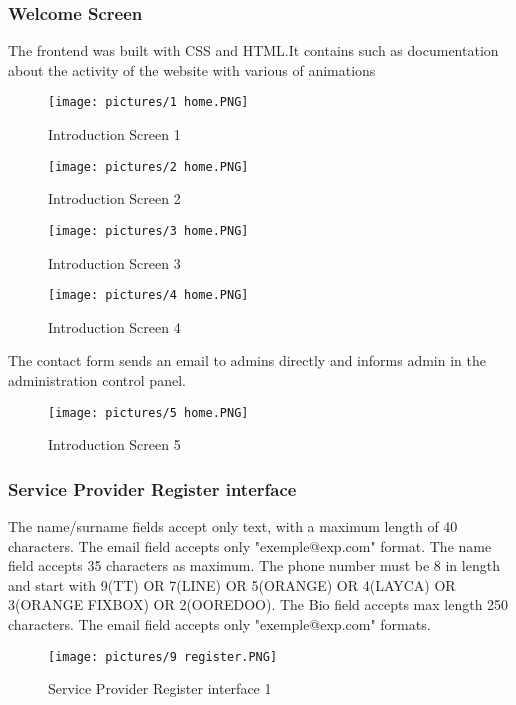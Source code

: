\documentclass[12pt]{report}
\begin{document}
\subsubsection{Welcome Screen}
The frontend was built with CSS and HTML.It contains such as documentation about the activity of the website with various of animations
\begin{figure}[!htbp]
    \centering
    \texttt{[image: pictures/1 home.PNG]}
    \caption{Introduction Screen 1}
    \label{fig:1}
\end{figure}

\begin{figure}[!htbp]
    \centering
    \texttt{[image: pictures/2 home.PNG]}
    \caption{Introduction Screen 2}
    \label{fig:2}
\end{figure}
\pagebreak
\begin{figure}[!htbp]
    \centering
    \texttt{[image: pictures/3 home.PNG]}
    \caption{Introduction Screen 3}
    \label{fig:3}
\end{figure}
\begin{figure}[!htbp]
    \centering
    \texttt{[image: pictures/4 home.PNG]}
    \caption{Introduction Screen 4}
    \label{fig:4}
\end{figure}
\pagebreak
The contact form sends an email to admins directly and informs admin in the administration control panel. 
\begin{figure}[!htbp]
    \centering
    \texttt{[image: pictures/5 home.PNG]}
    \caption{Introduction Screen 5}
    \label{fig:5}
\end{figure}







\pagebreak

\subsubsection{Service Provider Register interface}
The name/surname fields accept only text, with a maximum length of 40 characters.
The email field accepts only "exemple@exp.com" format.
The name field accepts 35 characters as maximum.
The phone number must be 8 in length and start with 9(TT) OR 7(LINE) OR 5(ORANGE) OR 4(LAYCA) OR 3(ORANGE FIXBOX) OR 2(OOREDOO). 
The Bio field accepts max length 250 characters.
The email field accepts only "exemple@exp.com" formats.
\begin{figure}[!htbp]
    \centering
    \texttt{[image: pictures/9 register.PNG]}
    \caption{Service Provider Register interface 1}
    \label{fig:6}
\end{figure}
\end{document}
